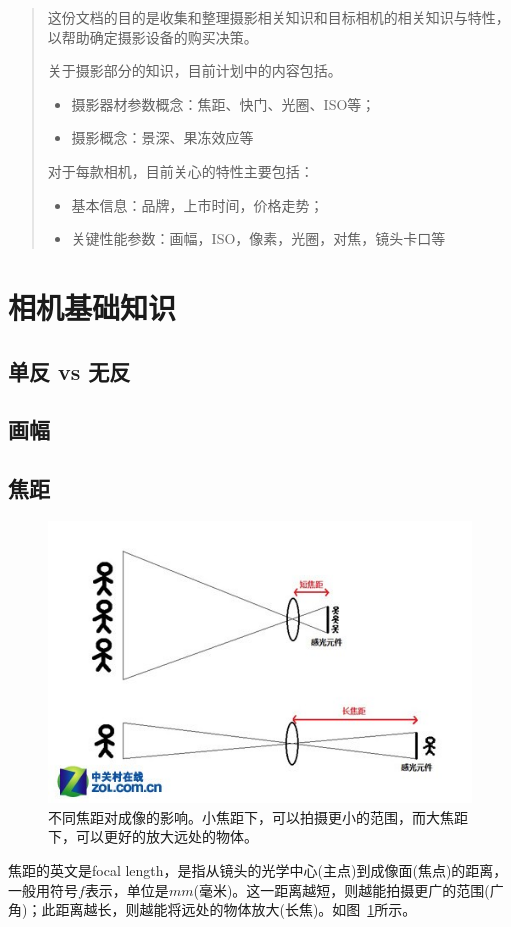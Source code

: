 \documentclass{ctexart}
\begin{document}
\tableofcontents

\begin{abstract}
这份文档的目的是收集和整理摄影相关知识和目标相机的相关知识与特性，以帮助确定摄影设备的购买决策。

关于摄影部分的知识，目前计划中的内容包括。
\begin{itemize}
    \item 摄影器材参数概念：焦距、快门、光圈、ISO等；
    \item 摄影概念：景深、果冻效应等
\end{itemize}
对于每款相机，目前关心的特性主要包括：
\begin{itemize}
    \item 基本信息：品牌，上市时间，价格走势；
    \item 关键性能参数：画幅，ISO，像素，光圈，对焦，镜头卡口等
\end{itemize}
\end{abstract}

\section{相机基础知识}

\subsection{单反 vs 无反}

\subsection{画幅}

\subsection{焦距~\cite{focal_length_shutter_etc}}
\begin{figure}[h!]
    \centering
    \includegraphics[width=.8\linewidth]{imgs/focal_length.jpg}
    \caption{不同焦距对成像的影响。小焦距下，可以拍摄更小的范围，而大焦距下，可以更好的放大远处的物体。}
    \label{fig_focal_length}
\end{figure}
焦距的英文是focal length，是指从镜头的光学中心(主点)到成像面(焦点)的距离，一般用符号$f$表示，单位是$mm$(毫米)。这一距离越短，则越能拍摄更广的范围(广角)；此距离越长，则越能将远处的物体放大(长焦)。如图~\ref{fig_focal_length}所示。
\end{document}
